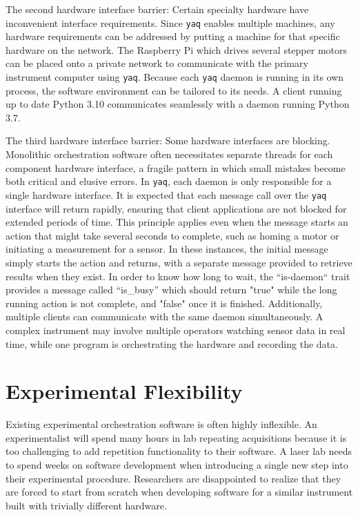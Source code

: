 \documentclass[aip, amsmath, amssymb, reprint,]{revtex4-2}
\newcommand\yaq{\texttt{yaq}}
\begin{document}
The second hardware interface barrier: Certain specialty hardware have inconvenient interface requirements.
Since \yaq{} enables multiple machines, any hardware requirements can be addressed by putting a machine for that specific hardware on the network.
The Raspberry Pi which drives several stepper motors can be placed onto a private network to communicate with the primary instrument computer using \yaq{}.
Because each \yaq{} daemon is running in its own process, the software environment can be tailored to its needs.
A client running up to date Python 3.10 communicates seamlessly with a daemon running Python 3.7.

The third hardware interface barrier: Some hardware interfaces are blocking.
Monolithic orchestration software often necessitates separate threads for each component hardware interface, a fragile pattern in which small mistakes become both critical and elusive errors.
In \yaq{}, each daemon is only responsible for a single hardware interface.
It is expected that each message call over the \yaq{} interface will return rapidly, ensuring that client applications are not blocked for extended periods of time.
This principle applies even when the message starts an action that might take several seconds to complete, such as homing a motor or initiating a measurement for a sensor.
In these instances, the initial message simply starts the action and returns, with a separate message provided to retrieve results when they exist.
In order to know how long to wait, the ``is-daemon`` trait provides a message called ``is\_busy'' which should return "true" while the long running action is not complete, and "false" once it is finished.
Additionally, multiple clients can communicate with the same daemon simultaneously.
A complex instrument may involve multiple operators watching sensor data in real time, while one program is orchestrating the hardware and recording the data.

\section{Experimental Flexibility}

Existing experimental orchestration software is often highly inflexible.
An experimentalist will spend many hours in lab repeating acquisitions because it is too challenging to add repetition functionality to their software.
A laser lab needs to spend weeks on software development when introducing a single new step into their experimental procedure.
Researchers are disappointed to realize that they are forced to start from scratch when developing software for a similar instrument built with trivially different hardware.
\end{document}
